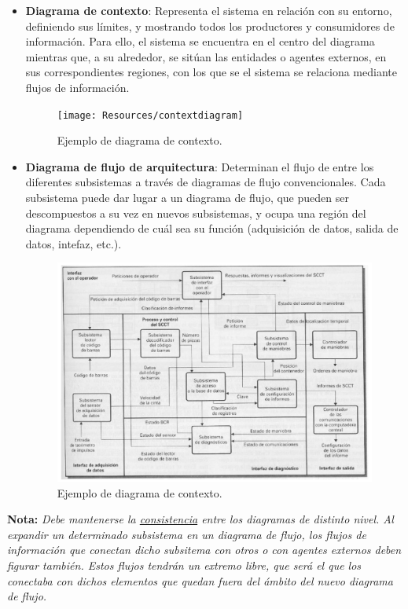 \begin{itemize}
    \item \textbf{Diagrama de contexto}: Representa el sistema en relación con su entorno, definiendo sus límites, y mostrando todos los productores y consumidores de información. Para ello, el sistema se encuentra en el centro del diagrama mientras que, a su alrededor, se sitúan las entidades o agentes externos, en sus correspondientes regiones, con los que se el sistema se relaciona mediante flujos de información.
        \begin{figure}[H]
            \centering
            \texttt{[image: Resources/contextdiagram]}
            \caption{Ejemplo de diagrama de contexto.}
            \label{fig:diagramaDeContexto}
        \end{figure}
    \item \textbf{Diagrama de flujo de arquitectura}: Determinan el flujo de entre los diferentes subsistemas a través de diagramas de flujo convencionales. Cada subsistema puede dar lugar a un diagrama de flujo, que pueden ser descompuestos a su vez en nuevos subsistemas, y ocupa una región del diagrama dependiendo de cuál sea su función (adquisición de datos, salida de datos, intefaz, etc.).
        \begin{figure}[H]
            \centering
            \includegraphics[width=0.8\linewidth]{Resources/Tema4/diagramaFlujo.png}
            \caption{Ejemplo de diagrama de contexto.}
            \label{fig:diagramaDeContexto}
        \end{figure}
\end{itemize}

\textbf{Nota:} \textit{Debe mantenerse la \uline{consistencia} entre los diagramas de distinto nivel. Al expandir un determinado subsistema en un diagrama de flujo, los flujos de información que conectan dicho subsitema con otros o con agentes externos deben figurar también. Estos flujos tendrán un extremo libre, que será el que los conectaba con dichos elementos que quedan fuera del ámbito del nuevo diagrama de flujo.
}

